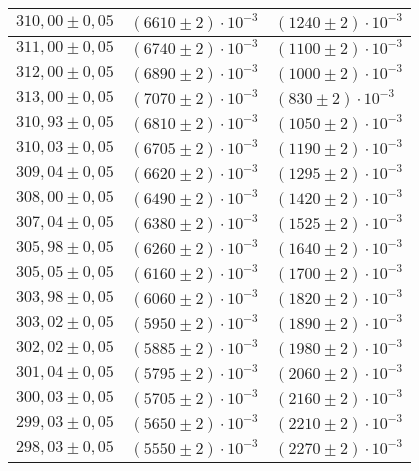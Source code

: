 \begin{tabular}{|l|l|l|}
$310{,}00 \pm 0{,}05$ & $\left(6610 \pm 2\right)\cdot 10^{-3}$ & $\left(1240 \pm 2\right)\cdot 10^{-3}$\\\hline
$311{,}00 \pm 0{,}05$ & $\left(6740 \pm 2\right)\cdot 10^{-3}$ & $\left(1100 \pm 2\right)\cdot 10^{-3}$\\\hline
$312{,}00 \pm 0{,}05$ & $\left(6890 \pm 2\right)\cdot 10^{-3}$ & $\left(1000 \pm 2\right)\cdot 10^{-3}$\\\hline
$313{,}00 \pm 0{,}05$ & $\left(7070 \pm 2\right)\cdot 10^{-3}$ & $\left(830 \pm 2\right)\cdot 10^{-3}$\\\hline
$310{,}93 \pm 0{,}05$ & $\left(6810 \pm 2\right)\cdot 10^{-3}$ & $\left(1050 \pm 2\right)\cdot 10^{-3}$\\\hline
$310{,}03 \pm 0{,}05$ & $\left(6705 \pm 2\right)\cdot 10^{-3}$ & $\left(1190 \pm 2\right)\cdot 10^{-3}$\\\hline
$309{,}04 \pm 0{,}05$ & $\left(6620 \pm 2\right)\cdot 10^{-3}$ & $\left(1295 \pm 2\right)\cdot 10^{-3}$\\\hline
$308{,}00 \pm 0{,}05$ & $\left(6490 \pm 2\right)\cdot 10^{-3}$ & $\left(1420 \pm 2\right)\cdot 10^{-3}$\\\hline
$307{,}04 \pm 0{,}05$ & $\left(6380 \pm 2\right)\cdot 10^{-3}$ & $\left(1525 \pm 2\right)\cdot 10^{-3}$\\\hline
$305{,}98 \pm 0{,}05$ & $\left(6260 \pm 2\right)\cdot 10^{-3}$ & $\left(1640 \pm 2\right)\cdot 10^{-3}$\\\hline
$305{,}05 \pm 0{,}05$ & $\left(6160 \pm 2\right)\cdot 10^{-3}$ & $\left(1700 \pm 2\right)\cdot 10^{-3}$\\\hline
$303{,}98 \pm 0{,}05$ & $\left(6060 \pm 2\right)\cdot 10^{-3}$ & $\left(1820 \pm 2\right)\cdot 10^{-3}$\\\hline
$303{,}02 \pm 0{,}05$ & $\left(5950 \pm 2\right)\cdot 10^{-3}$ & $\left(1890 \pm 2\right)\cdot 10^{-3}$\\\hline
$302{,}02 \pm 0{,}05$ & $\left(5885 \pm 2\right)\cdot 10^{-3}$ & $\left(1980 \pm 2\right)\cdot 10^{-3}$\\\hline
$301{,}04 \pm 0{,}05$ & $\left(5795 \pm 2\right)\cdot 10^{-3}$ & $\left(2060 \pm 2\right)\cdot 10^{-3}$\\\hline
$300{,}03 \pm 0{,}05$ & $\left(5705 \pm 2\right)\cdot 10^{-3}$ & $\left(2160 \pm 2\right)\cdot 10^{-3}$\\\hline
$299{,}03 \pm 0{,}05$ & $\left(5650 \pm 2\right)\cdot 10^{-3}$ & $\left(2210 \pm 2\right)\cdot 10^{-3}$\\\hline
$298{,}03 \pm 0{,}05$ & $\left(5550 \pm 2\right)\cdot 10^{-3}$ & $\left(2270 \pm 2\right)\cdot 10^{-3}$\\\hline

\end{tabular}
